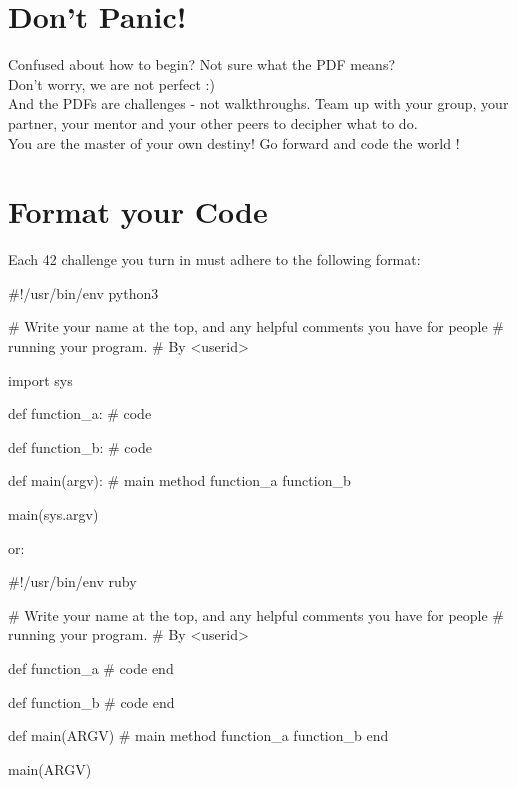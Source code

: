 \documentclass{42-en}
\begin{document}
\chapter{Don't Panic!}

Confused about how to begin? Not sure what the PDF means?\\

Don't worry, we are not perfect :)\\

And the PDFs are challenges - not walkthroughs. Team up with your group, your partner,
your mentor and your other peers to decipher what to do.\\

You are the master of your own destiny! Go forward and code the world !


\chapter{Format your Code}

Each 42 challenge you turn in must adhere to the following format:

\begin{42pycode}
#!/usr/bin/env python3

# Write your name at the top, and any helpful comments you have for people
# running your program.
# By <userid>

import sys

def function_a:
    # code

def function_b:
    # code

def main(argv):
    # main method
    function_a
    function_b

main(sys.argv)
\end{42pycode}

or:\\

\begin{42rbcode}
#!/usr/bin/env ruby

# Write your name at the top, and any helpful comments you have for people
# running your program.
# By <userid>

def function_a
 # code
end

def function_b
 # code
end

def main(ARGV)
 # main method
 function_a
 function_b
end

main(ARGV)
\end{42rbcode}
\end{document}
